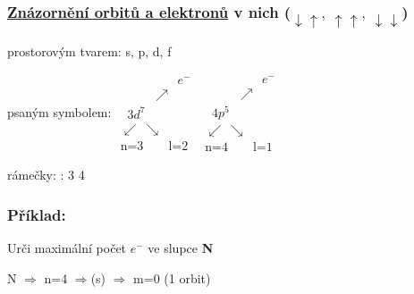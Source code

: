 \subsubsection[Znázornění orbitů a elektronů]{\underline{Znázornění orbitů a elektronů} v nich ($\downarrow \uparrow,~ \uparrow \uparrow,~ \downarrow\downarrow$)}
\begin{description}
    \TabPositions{0em, 12em}
    \vspace{1em}
    \item[a)] prostorovým tvarem: \tab s, p, d, f
    \vspace{2em}
    \item[b)] psaným symbolem: \tab
    \(
        \begin{array}{c}
            \qquad\qquad\;\; e^- \\
            \qquad \;\;\; \nearrow \\
            \;\; 3d^7 \\
            \swarrow~\searrow \\
            \mbox{n=3} \qquad \mbox{l=2}
        \end{array}
    \)
    \hspace{6em}
    \(
        \begin{array}{c}
            \qquad\qquad\;\; e^-\\
            \qquad \;\;\; \nearrow \\
            \;\;4p^5 \\
            \swarrow~\searrow \\
            \mbox{n=4} \qquad \mbox{l=1}

        \end{array}
    \)
    \vspace{2em}
    \item[c)] rámečky: \tab  : 3 \fbox{$\downarrow\uparrow$}\fbox{$\downarrow\uparrow$}\fbox{$\downarrow$ }\fbox{$\downarrow$ }\fbox{$\downarrow$ } \hspace{3em} 4 \fbox{$\downarrow\uparrow$}\fbox{$\downarrow\uparrow$}\fbox{$\downarrow$ }
\end{description}

\newpage
\subsubsection*{\textbf{Příklad:}}
Urči maximální počet $e^-$ ve slupce \textbf{N}

\smallskip
\TabPositions{0em, 7em}
N $\Rightarrow$ n=4 $\Rightarrow$(s) $\Rightarrow$ m=0 (1 orbit)

